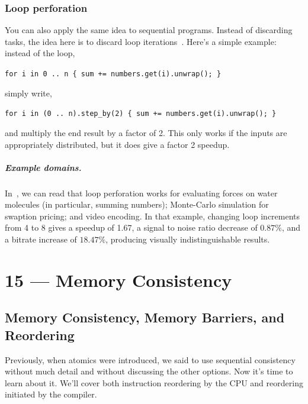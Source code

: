 \documentclass[a4paper]{report}
\begin{document}
\subsection*{Loop perforation} 
You can also apply the same idea to sequential programs. Instead
of discarding tasks, the idea here is to discard loop iterations~\cite{hoffmann09:_using_code_perfor_improv_perfor}.
Here's a simple example: instead of the loop,
\begin{center}
\verb|for i in 0 .. n { sum += numbers.get(i).unwrap(); }|
\end{center} \vspace*{-1em}
simply write,
\vspace*{-1em}\begin{center}
\verb|for i in (0 .. n).step_by(2) { sum += numbers.get(i).unwrap(); }|
\end{center}
and multiply the end result by a factor of 2. This only works 
if the inputs are appropriately distributed, but it does give a
factor 2 speedup.

\paragraph{Example domains.} In~\cite{Rinard:2010:PSA:1932682.1869525},
we can read that loop perforation works for evaluating forces on water
molecules (in particular, summing numbers); Monte-Carlo simulation for
swaption pricing; and video encoding. In that example, changing loop
increments from 4 to 8 gives a speedup of 1.67, a signal to noise ratio
decrease of $0.87\%$, and a bitrate increase of $18.47\%$, producing
visually indistinguishable results. 










\chapter*{15 --- Memory Consistency}


\section*{Memory Consistency, Memory Barriers, and Reordering}
Previously, when atomics were introduced, we said to use sequential consistency without much detail and without discussing the other options. Now it's time to learn about it. We'll cover both instruction reordering by
the CPU and reordering initiated by the compiler.  
\end{document}
